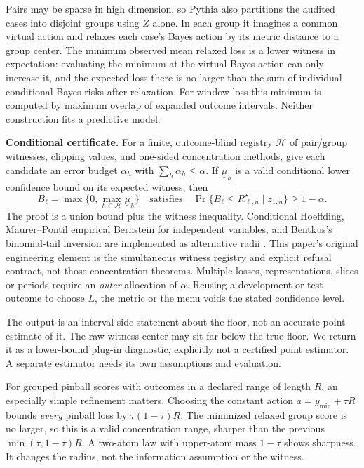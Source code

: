 \documentclass[11pt,a4paper]{article}
\newcommand{\risk}{R^{\star}}
\begin{document}
Pairs may be sparse in high dimension, so Pythia also partitions the audited cases into disjoint groups using $Z$ alone. In each group it imagines a common virtual action and relaxes each case's Bayes action by its metric distance to a group center. The minimum observed mean relaxed loss is a lower witness in expectation: evaluating the minimum at the virtual Bayes action can only increase it, and the expected loss there is no larger than the sum of individual conditional Bayes risks after relaxation. For window loss this minimum is computed by maximum overlap of expanded outcome intervals. Neither construction fits a predictive model.

\textbf{Conditional certificate.} For a finite, outcome-blind registry $\mathcal H$ of pair/group witnesses, clipping values, and one-sided concentration methods, give each candidate an error budget $\alpha_h$ with $\sum_h\alpha_h\leq\alpha$. If $\underline\mu_h$ is a valid conditional lower confidence bound on its expected witness, then
\begin{equation}
B_\ell=\max\bigl\{0,\max_{h\in\mathcal H}\underline\mu_h\bigr\}
\quad\text{satisfies}\quad
\Pr\{B_\ell\leq\risk_{\ell,n}\mid z_{1:n}\}\geq 1-\alpha.\label{eq:certificate}
\end{equation}
The proof is a union bound plus the witness inequality. Conditional Hoeffding, Maurer--Pontil empirical Bernstein for independent variables, and Bentkus's binomial-tail inversion are implemented as alternative radii \cite{hoeffding,maurer,bentkus}. This paper's original engineering element is the simultaneous witness registry and explicit refusal contract, not those concentration theorems. Multiple losses, representations, slices or periods require an \emph{outer} allocation of $\alpha$. Reusing a development or test outcome to choose $L$, the metric or the menu voids the stated confidence level.

The output is an interval-side statement about the floor, not an accurate point estimate of it. The raw witness center may sit far below the true floor. We return it as a lower-bound plug-in diagnostic, explicitly not a certified point estimator. A separate estimator needs its own assumptions and evaluation.

For grouped pinball scores with outcomes in a declared range of length $R$, an especially simple refinement matters. Choosing the constant action $a=y_{\min}+\tau R$ bounds \emph{every} pinball loss by $\tau(1-\tau)R$. The minimized relaxed group score is no larger, so this is a valid concentration range, sharper than the previous $\min(\tau,1-\tau)R$. A two-atom law with upper-atom mass $1-\tau$ shows sharpness. It changes the radius, not the information assumption or the witness.
\end{document}
